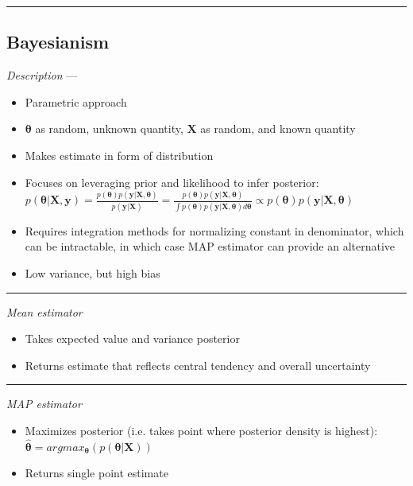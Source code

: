 {\color{black}\hrule height 0.001mm}

\subsection*{Bayesianism}
\emph{Description} --- 
\begin{itemize}
    \item Parametric approach
    \item $\boldsymbol{\theta}$ as random, unknown quantity, $\boldsymbol{X}$ as random, and known quantity
    \item Makes estimate in form of distribution
    \item Focuses on leveraging prior and likelihood to infer posterior: $p(\boldsymbol{\theta}|\boldsymbol{X}, \boldsymbol{y}) = \frac{p(\boldsymbol{\theta})p(\boldsymbol{y}|\boldsymbol{X}, \boldsymbol{\theta})}{p(\boldsymbol{y}|\boldsymbol{X})} = \frac{p(\boldsymbol{\theta})p(\boldsymbol{y}|\boldsymbol{X}, \boldsymbol{\theta})}{\int p(\boldsymbol{\theta}) p(\boldsymbol{y}|\boldsymbol{X}, \boldsymbol{\theta}) d\boldsymbol{\theta}} \propto p(\boldsymbol{\theta})p(\boldsymbol{y}|\boldsymbol{X}, \boldsymbol{\theta})$ 
    \item Requires integration methods for normalizing constant in denominator, which can be intractable, in which case MAP estimator can provide an alternative
    \item Low variance, but high bias 
\end{itemize}

{\color{lightgray}\hrule height 0.001mm}

\emph{Mean estimator}
\begin{itemize}
    \item Takes expected value and variance posterior
    \item Returns estimate that reflects central tendency and overall uncertainty
\end{itemize}

{\color{lightgray}\hrule height 0.001mm}

\emph{MAP estimator}
\begin{itemize}
    \item Maximizes posterior (i.e. takes point where posterior density is highest): $\hat{\boldsymbol{\theta}} = argmax_{\boldsymbol{\theta}}( p(\boldsymbol{\theta}|\boldsymbol{X}) )$
    \item Returns single point estimate
\end{itemize}

